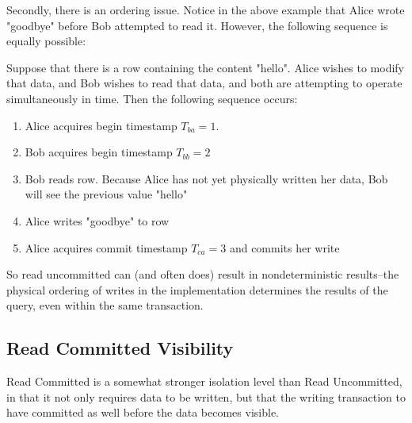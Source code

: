 Secondly, there is an ordering issue. Notice in the above example that Alice wrote "goodbye" before Bob attempted to read it. However, the following sequence is equally possible:

\begin{exmp}
				Suppose that there is a row containing the content "hello". Alice wishes to modify that data, and Bob wishes to read that data, and both are attempting to operate simultaneously in time. Then the following sequence occurs:
\begin{enumerate}
	\item Alice acquires begin timestamp $T_{ba} = 1$.
	\item Bob acquires begin timestamp $T_{bb} = 2$
	\item Bob reads row. Because Alice has not yet physically written her data, Bob will see the previous value "hello"
	\item Alice writes "goodbye" to row
	\item Alice acquires commit timestamp $T_{ca} = 3$ and commits her write	
\end{enumerate}
\end{exmp}
So read uncommitted can (and often does) result in nondeterministic results--the physical ordering of writes in the implementation determines the results of the query, even within the same transaction.

\subsection{Read Committed Visibility}
Read Committed is a somewhat stronger isolation level than Read Uncommitted, in that it not only requires data to be written, but that the writing transaction to have committed as well before the data becomes visible.


